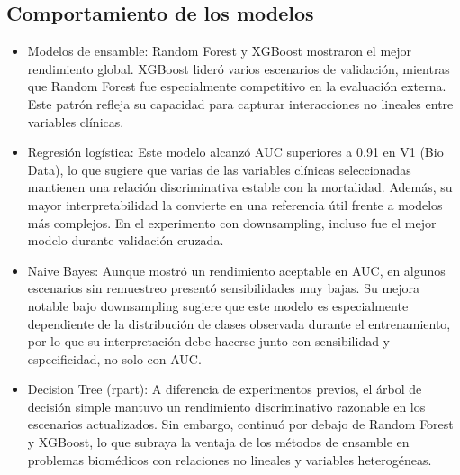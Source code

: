 \subsection{Comportamiento de los modelos}

\begin{itemize}
  \item Modelos de ensamble: Random Forest y XGBoost mostraron el mejor
    rendimiento global. XGBoost lideró varios escenarios de validación, mientras
    que Random Forest fue especialmente competitivo en la evaluación externa.
    Este patrón refleja su capacidad para capturar interacciones no lineales
    entre variables clínicas.
  \item Regresión logística: Este modelo alcanzó AUC superiores a 0.91 en V1 (Bio Data),
    lo que sugiere que varias de las variables clínicas seleccionadas mantienen
    una relación discriminativa estable con la mortalidad. Además, su mayor
    interpretabilidad la convierte en una referencia útil frente a modelos más
    complejos. En el experimento con downsampling, incluso fue el mejor modelo
    durante validación cruzada.
  \item Naive Bayes: Aunque mostró un rendimiento aceptable en AUC, en algunos
    escenarios sin remuestreo presentó sensibilidades muy bajas. Su mejora
    notable bajo downsampling sugiere que este modelo es especialmente
    dependiente de la distribución de clases observada durante el entrenamiento,
    por lo que su interpretación debe hacerse junto con sensibilidad y
    especificidad, no solo con AUC.
  \item Decision Tree (rpart): A diferencia de experimentos previos, el árbol de
    decisión simple mantuvo un rendimiento discriminativo razonable en los
    escenarios actualizados. Sin embargo, continuó por debajo de Random Forest y
    XGBoost, lo que subraya la ventaja de los métodos de ensamble en problemas
    biomédicos con relaciones no lineales y variables heterogéneas.
\end{itemize}
